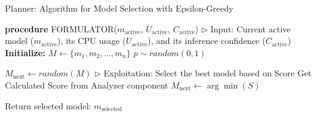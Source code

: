 \begin{algorithm}
\begin{small}
\caption{Planner: Algorithm for Model Selection with Epsilon-Greedy}\label{alg:selection}
\begin{algorithmic}[1]
\STATE \textbf{procedure} FORMULATOR(\(m_\text{active}\), \(U_\text{active}\), \(C_\text{active}\)) \(\triangleright\) Input: Current active model (\(m_\text{active}\)), its CPU usage (\(U_\text{active}\)), and its inference confidence (\(C_\text{active}\))
\STATE \textbf{Initialize:}
\STATE \hspace{1em} $M \gets \{ m_1, m_2, \dots, m_n \}$
\STATE \hspace{1em} $p \sim \textit{random}(0, 1)$

    \STATE \(M_{\text{next}} \gets random(M)\)
\ELSE 
    \STATE \(\triangleright\) Exploitation: Select the best model based on Score
        \STATE Get Calculated Score from Analyzer component
        \STATE \(M_{\text{next}} \gets \arg\min(S)\)
    \ENDFOR
\ENDIF

\STATE Return selected model: \(m_\text{selected}\)
\end{algorithmic}
\end{small}
\end{algorithm}
